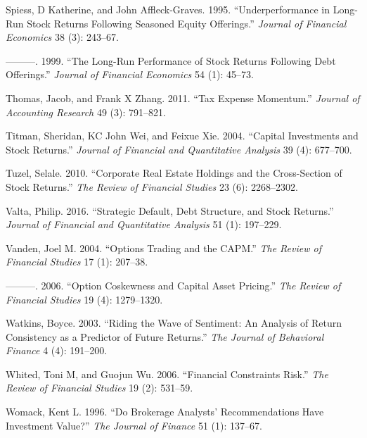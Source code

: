 \documentclass[
  letterpaper,
  DIV=11,
  numbers=noendperiod]{scrreprt}
\newlength{\cslhangindent}
\newlength{\cslentryspacingunit} %
\newenvironment{CSLReferences}[2] %
 {%
  \setlength{\parindent}{0pt}
  \ifodd #1
  \let\oldpar\par
  \def\par{\hangindent=\cslhangindent\oldpar}
  \fi
  \setlength{\parskip}{#2\cslentryspacingunit}
 }%
 {}
\begin{document}
\begin{CSLReferences}{1}{0}
\leavevmode{}%
Spiess, D Katherine, and John Affleck-Graves. 1995. {``Underperformance
in Long-Run Stock Returns Following Seasoned Equity Offerings.''}
\emph{Journal of Financial Economics} 38 (3): 243--67.

\leavevmode{}%
---------. 1999. {``The Long-Run Performance of Stock Returns Following
Debt Offerings.''} \emph{Journal of Financial Economics} 54 (1): 45--73.

\leavevmode{}%
Thomas, Jacob, and Frank X Zhang. 2011. {``Tax Expense Momentum.''}
\emph{Journal of Accounting Research} 49 (3): 791--821.

\leavevmode{}%
Titman, Sheridan, KC John Wei, and Feixue Xie. 2004. {``Capital
Investments and Stock Returns.''} \emph{Journal of Financial and
Quantitative Analysis} 39 (4): 677--700.

\leavevmode{}%
Tuzel, Selale. 2010. {``Corporate Real Estate Holdings and the
Cross-Section of Stock Returns.''} \emph{The Review of Financial
Studies} 23 (6): 2268--2302.

\leavevmode{}%
Valta, Philip. 2016. {``Strategic Default, Debt Structure, and Stock
Returns.''} \emph{Journal of Financial and Quantitative Analysis} 51
(1): 197--229.

\leavevmode{}%
Vanden, Joel M. 2004. {``Options Trading and the CAPM.''} \emph{The
Review of Financial Studies} 17 (1): 207--38.

\leavevmode{}%
---------. 2006. {``Option Coskewness and Capital Asset Pricing.''}
\emph{The Review of Financial Studies} 19 (4): 1279--1320.

\leavevmode{}%
Watkins, Boyce. 2003. {``Riding the Wave of Sentiment: An Analysis of
Return Consistency as a Predictor of Future Returns.''} \emph{The
Journal of Behavioral Finance} 4 (4): 191--200.

\leavevmode{}%
Whited, Toni M, and Guojun Wu. 2006. {``Financial Constraints Risk.''}
\emph{The Review of Financial Studies} 19 (2): 531--59.

\leavevmode{}%
Womack, Kent L. 1996. {``Do Brokerage Analysts' Recommendations Have
Investment Value?''} \emph{The Journal of Finance} 51 (1): 137--67.


\end{CSLReferences}
\end{document}
